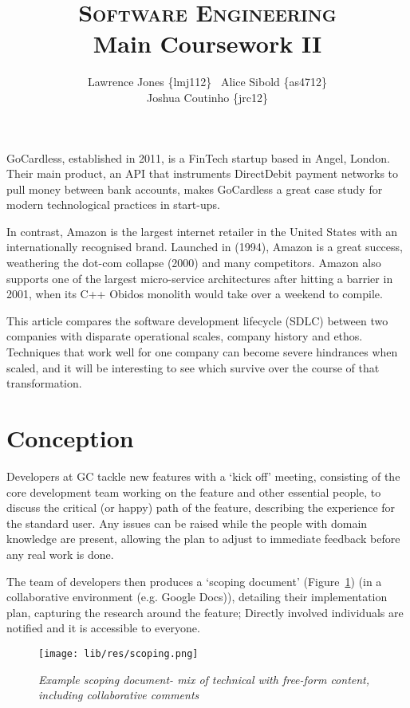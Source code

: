 \documentclass[11pt]{article}
\title{\textsc{Software Engineering}\\Main Coursework II}
\author{Lawrence Jones \{lmj112\} \  Alice Sibold \{as4712\} \\
        Joshua Coutinho \{jrc12\}}
\date{}
\begin{document}
\maketitle


GoCardless, established in 2011, is a FinTech startup based in Angel, London. Their main product, an API that
instruments DirectDebit payment networks to pull money between bank accounts, makes
GoCardless a great case study for modern technological practices in start-ups.

In contrast, Amazon is the largest internet retailer in the United States with
an internationally recognised brand. Launched in (1994), Amazon
is a great success, weathering
the dot-com collapse (2000) and many competitors.
Amazon also supports one of the largest micro-service
architectures after hitting a barrier in 2001, when its C++ Obidos monolith
would take over a weekend to compile.

This article compares the software development lifecycle (SDLC)
between two companies with disparate operational scales, company history
and ethos. Techniques that work well for one company can become severe
hindrances when scaled, and it will be interesting to see which survive over
the course of that transformation.

\section{Conception}

Developers at GC tackle new features with a `kick off' meeting, consisting of
the core development team working on the feature and other essential people, 
to discuss the critical (or
happy) path of the feature, describing the experience for the standard user.
Any issues can be raised while the people with domain
knowledge are present, allowing the plan to adjust to immediate feedback before
any real work is done.

The team of developers then produces a `scoping
document' (Figure~\ref{fig:scoping}) (in a collaborative environment (e.g. Google Docs)), 
detailing their implementation plan, capturing the research around the feature; 
Directly involved individuals are notified and it is accessible to everyone.

\begin{figure}
\centering
\texttt{[image: lib/res/scoping.png]}
\caption{\label{fig:scoping}\textit{Example scoping document- mix of technical with
free-form content, including collaborative comments}}
\end{figure}
\end{document}

